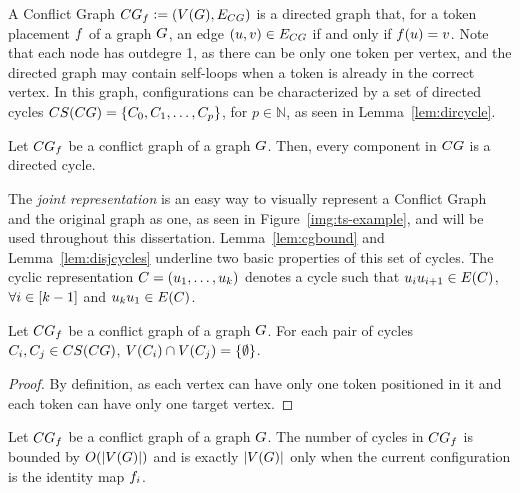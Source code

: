 \documentclass[msc,english,table,xcdraw]{ppgccufmg}
\begin{document}
A Conflict Graph $CG_{f} \vcentcolon= (V(G), 
E_{CG})$ is a directed graph that, for a token placement 
$f$ of a graph $G$, an edge $(u, v) \in 
E_{CG}$ if and only if $f(u) = v$.
Note that each node has outdegre 1, as there can be only one token per vertex, 
and the directed graph may contain self-loops when a token is already in the
correct vertex.
In this graph, configurations can be characterized by a set of directed 
cycles $CS(CG) = \{C_{0}, 
C_{1}, \ldots, C_{p}\}$, for $p \in \mathbb{N}$, as seen in 
Lemma~\ref{lem:dircycle}.

\begin{lemma}
\label{lem:dircycle}
\citep{Yamanaka:2015}
Let $CG_{f}$ be a conflict graph of a graph $G$.
Then, every component in $CG$ is a directed cycle.
\end{lemma}

The \textit{joint representation} is an easy way to visually represent a Conflict 
Graph and the original graph as one, as seen in Figure~\ref{img:ts-example}, 
and will be used throughout this dissertation.
Lemma~\ref{lem:cgbound} and Lemma~\ref{lem:disjcycles} underline two basic 
properties of this set of cycles.
The cyclic representation $C = (u_{1}, \ldots, u_
{k})$ denotes a cycle such that $u_{i}u_{i+1} \in E(C)$, $\forall i \in [k-1]$ and $u_{k}u_{1} \in 
E(C)$.

\begin{lemma}
\label{lem:disjcycles}
Let $CG_{f}$ be a conflict graph of a graph $G$.
For each pair of cycles $C_{i},C_{j} \in CS(CG)$, $V(C_{i}) \cap V(C_{j}) =
\{\emptyset\}$.
\end{lemma}

\begin{proof}
By definition, as each vertex can have only one token positioned in it and 
each token can have only one target vertex.
\end{proof}

\begin{lemma}
\label{lem:cgbound}
Let $CG_{f}$ be a conflict graph of a graph $G$.
The number of cycles in $CG_{f}$ is bounded by 
$O(|V(G)|)$ and is exactly $|V(G)|$ only 
when the current configuration is the identity map $f_{i}$.
\end{lemma}
\end{document}
